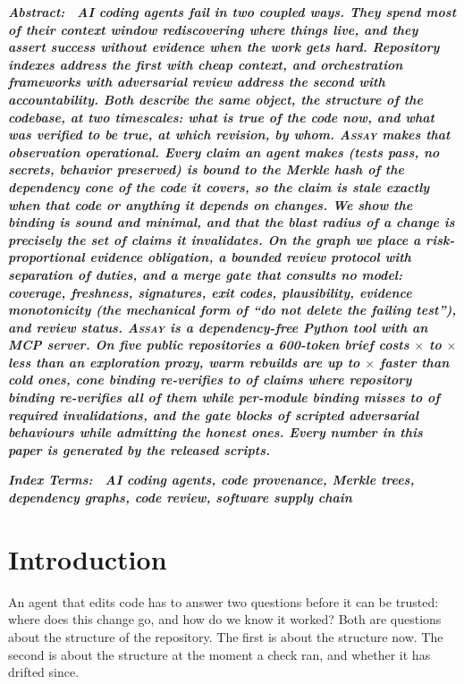\documentclass[conference]{IEEEtran}
\makeatletter
\newcommand{\assay}{\textsc{Assay}}
\renewenvironment{abstract}{\normalfont
  \@IEEEtweakunitybaselinestretch{1}
  \bfseries\itshape\footnotesize
  \noindent Abstract:\ \ignorespaces}{\par}
\renewenvironment{IEEEkeywords}{\normalfont
  \@IEEEtweakunitybaselinestretch{1}
  \bfseries\itshape\footnotesize
  \noindent Index Terms:\ \ignorespaces}{\par}
\makeatother
\begin{document}
\begin{abstract}
AI coding agents fail in two coupled ways. They spend most of their context window rediscovering where things live, and they assert success without evidence when the work gets hard. Repository indexes address the first with cheap context, and orchestration frameworks with adversarial review address the second with accountability. Both describe the same object, the structure of the codebase, at two timescales: what is true of the code now, and what was verified to be true, at which revision, by whom. \assay{} makes that observation operational. Every claim an agent makes (\emph{tests pass}, \emph{no secrets}, \emph{behavior preserved}) is bound to the Merkle hash of the dependency cone of the code it covers, so the claim is stale exactly when that code or anything it depends on changes. We show the binding is sound and minimal, and that the blast radius of a change is precisely the set of claims it invalidates. On the graph we place a risk-proportional evidence obligation, a bounded review protocol with separation of duties, and a merge gate that consults no model: coverage, freshness, signatures, exit codes, plausibility, evidence monotonicity (the mechanical form of ``do not delete the failing test''), and review status. \assay{} is a dependency-free Python tool with an MCP server. On five public repositories a 600-token brief costs \EOneMinXExpl$\times$ to \EOneMaxXExpl$\times$ less than an exploration proxy, warm rebuilds are up to \ETwoMaxSpeedupNoop$\times$ faster than cold ones, cone binding re-verifies \EThreeMinConeCost{} to \EThreeMaxConeCost{} of claims where repository binding re-verifies all of them while per-module binding misses \EThreeMinSelfMissed{} to \EThreeMaxSelfMissed{} of required invalidations, and the gate blocks \EFourBlocked{} of \EFourBlocked{} scripted adversarial behaviours while admitting the honest ones. Every number in this paper is generated by the released scripts.
\end{abstract}

\begin{IEEEkeywords}
AI coding agents, code provenance, Merkle trees, dependency graphs, code review, software supply chain
\end{IEEEkeywords}

\section{Introduction}

An agent that edits code has to answer two questions before it can be trusted: where does this change go, and how do we know it worked? Both are questions about the structure of the repository. The first is about the structure now. The second is about the structure at the moment a check ran, and whether it has drifted since.
\end{document}
